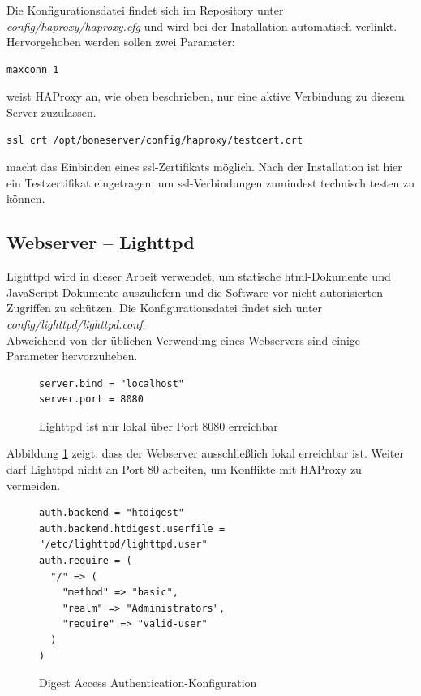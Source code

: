 \documentclass[thesis.tex]{subfiles}
\begin{document}
Die Konfigurationsdatei findet sich im Repository unter \textit{config/haproxy/haproxy.cfg} und wird bei der Installation automatisch verlinkt.
Hervorgehoben werden sollen zwei Parameter:

\begin{lstlisting}
maxconn 1
\end{lstlisting}
weist HAProxy an, wie oben beschrieben, nur eine aktive Verbindung zu diesem Server zuzulassen.

\begin{lstlisting}
ssl crt /opt/boneserver/config/haproxy/testcert.crt
\end{lstlisting}
macht das Einbinden eines \gls{ssl}-Zertifikats möglich. Nach der Installation ist hier ein Testzertifikat eingetragen, um \gls{ssl}-Verbindungen zumindest technisch testen zu können.


\subsection{Webserver -- Lighttpd}
\label{subsec:Lighttpd}
Lighttpd wird in dieser Arbeit verwendet, um statische \gls{html}-Dokumente und JavaScript-Dokumente auszuliefern und die Software vor nicht autorisierten Zugriffen zu schützen. Die Konfigurationsdatei findet sich unter \textit{config/lighttpd/lighttpd.conf}.\\

Abweichend von der üblichen Verwendung eines Webservers sind einige Parameter hervorzuheben.

\begin{figure}[ht]
\begin{lstlisting}
server.bind = "localhost"
server.port = 8080
\end{lstlisting}
\caption{Lighttpd ist nur lokal über Port 8080 erreichbar}
\label{lst:lighttpdLocal}
\end{figure}

Abbildung \ref{lst:lighttpdLocal} zeigt, dass der Webserver ausschließlich lokal erreichbar ist. Weiter darf Lighttpd nicht an Port 80 arbeiten, um Konflikte mit HAProxy zu vermeiden.\\

\begin{figure}[ht]
\begin{lstlisting}
auth.backend = "htdigest"
auth.backend.htdigest.userfile = "/etc/lighttpd/lighttpd.user"
auth.require = (
  "/" => (
    "method" => "basic",
    "realm" => "Administrators",
    "require" => "valid-user"
  )
)
\end{lstlisting}
\caption{Digest Access Authentication-Konfiguration}
\label{lst:lighttpdhtdigest}
\end{figure}
\end{document}
